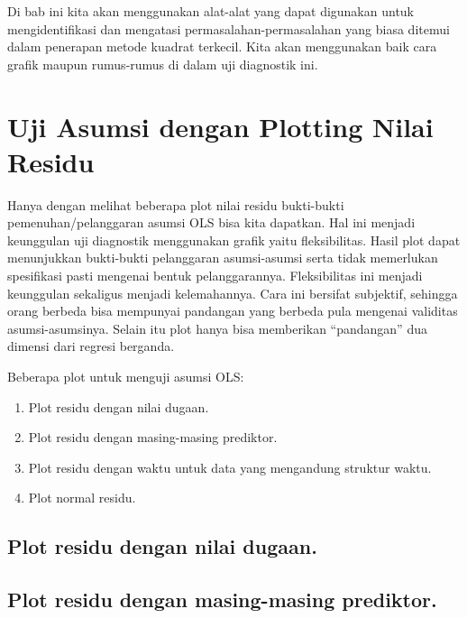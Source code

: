 \documentclass[
]{book}
\providecommand{\tightlist}{%
  \setlength{\itemsep}{0pt}\setlength{\parskip}{0pt}}
\begin{document}
Di bab ini kita akan menggunakan alat-alat yang dapat digunakan untuk mengidentifikasi dan mengatasi permasalahan-permasalahan yang biasa ditemui dalam penerapan metode kuadrat terkecil. Kita akan menggunakan baik cara grafik maupun rumus-rumus di dalam uji diagnostik ini.

\hypertarget{uji-asumsi-dengan-plotting-nilai-residu}{%
\section{Uji Asumsi dengan Plotting Nilai Residu}\label{uji-asumsi-dengan-plotting-nilai-residu}}

Hanya dengan melihat beberapa plot nilai residu bukti-bukti pemenuhan/pelanggaran asumsi OLS bisa kita dapatkan. Hal ini menjadi keunggulan uji diagnostik menggunakan grafik yaitu fleksibilitas. Hasil plot dapat menunjukkan bukti-bukti pelanggaran asumsi-asumsi serta tidak memerlukan spesifikasi pasti mengenai bentuk pelanggarannya. Fleksibilitas ini menjadi keunggulan sekaligus menjadi kelemahannya. Cara ini bersifat subjektif, sehingga orang berbeda bisa mempunyai pandangan yang berbeda pula mengenai validitas asumsi-asumsinya. Selain itu plot hanya bisa memberikan ``pandangan'' dua dimensi dari regresi berganda.

Beberapa plot untuk menguji asumsi OLS:

\begin{enumerate}
\def\labelenumi{\arabic{enumi}.}
\tightlist
\item
  Plot residu dengan nilai dugaan.
\item
  Plot residu dengan masing-masing prediktor.
\item
  Plot residu dengan waktu untuk data yang mengandung struktur waktu.
\item
  Plot normal residu.
\end{enumerate}

\hypertarget{plot-residu-dengan-nilai-dugaan.}{%
\subsection{Plot residu dengan nilai dugaan.}\label{plot-residu-dengan-nilai-dugaan.}}

\hypertarget{plot-residu-dengan-masing-masing-prediktor.}{%
\subsection{Plot residu dengan masing-masing prediktor.}\label{plot-residu-dengan-masing-masing-prediktor.}}
\end{document}
